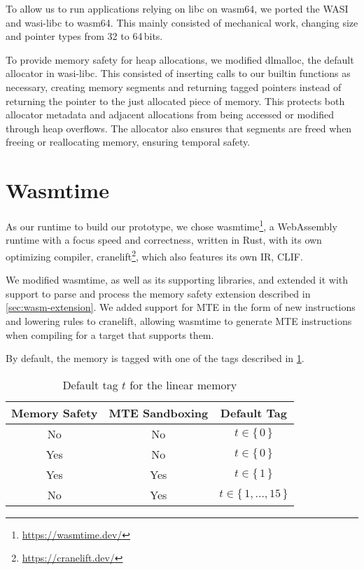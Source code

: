 To allow us to run applications relying on libc on wasm64, we ported the \acf{WASI} and wasi-libc to wasm64.
This mainly consisted of mechanical work, changing size and pointer types from 32 to 64\,bits.

To provide memory safety for heap allocations, we modified dlmalloc, the default allocator in wasi-libc.
This consisted of inserting calls to our builtin functions as necessary, creating memory segments and returning tagged pointers instead of returning the pointer to the just allocated piece of memory.
This protects both allocator metadata and adjacent allocations from being accessed or modified through heap overflows.
The allocator also ensures that segments are freed when freeing or reallocating memory, ensuring temporal safety.

\section{Wasmtime}
\label{sec:wasm-runtime}

As our runtime to build our prototype, we chose wasmtime\footnote{\url{https://wasmtime.dev/}}, a WebAssembly runtime with a focus speed and correctness, written in Rust, with its own optimizing compiler, cranelift\footnote{\url{https://cranelift.dev/}}, which also features its own \ac{IR}, \ac{CLIF}.

We modified wasmtime, as well as its supporting libraries, and extended it with support to parse and process the memory safety extension described in \cref{sec:wasm-extension}.
We added support for \ac{MTE} in the form of new instructions and lowering rules to cranelift, allowing wasmtime to generate \ac{MTE} instructions when compiling for a target that supports them.

By default, the memory is tagged with one of the tags described in \cref{tab:default-tag}.

\begin{table}
  \centering
  \begin{tabular}{c | c || c}
    \textbf{Memory Safety} & \textbf{MTE Sandboxing} & \textbf{Default Tag} \\
    \hline
    No & No & $t \in \{\,0\,\}$ \\
    Yes & No & $t \in \{\,0\,\}$ \\
    Yes & Yes & $t \in \{\,1\,\}$ \\
    No & Yes & $t \in \{\,1, \dots, 15\,\}$
  \end{tabular}
  \caption{Default tag $t$ for the linear memory}
  \label{tab:default-tag}
\end{table}

